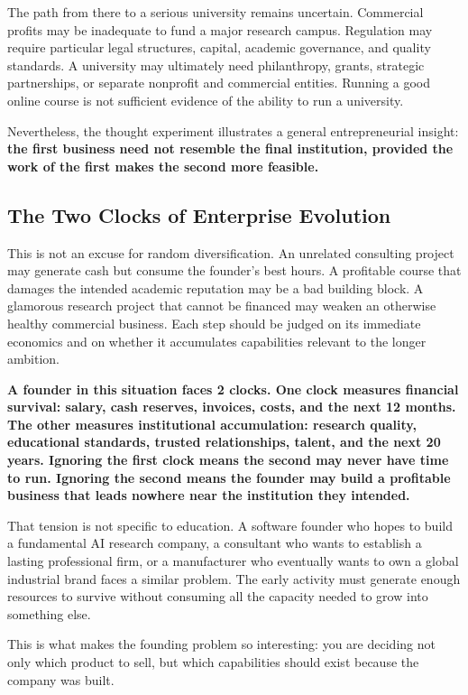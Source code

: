 The path from there to a serious university remains uncertain. Commercial profits may be inadequate to fund a major research campus. Regulation may require particular legal structures, capital, academic governance, and quality standards. A university may ultimately need philanthropy, grants, strategic partnerships, or separate nonprofit and commercial entities. Running a good online course is not sufficient evidence of the ability to run a university.

Nevertheless, the thought experiment illustrates a general entrepreneurial insight: \textbf{the first business need not resemble the final institution, provided the work of the first makes the second more feasible.}

\subsection{The Two Clocks of Enterprise Evolution}

This is not an excuse for random diversification. An unrelated consulting project may generate cash but consume the founder's best hours. A profitable course that damages the intended academic reputation may be a bad building block. A glamorous research project that cannot be financed may weaken an otherwise healthy commercial business. Each step should be judged on its immediate economics and on whether it accumulates capabilities relevant to the longer ambition.

\textbf{A founder in this situation faces 2 clocks. One clock measures financial survival: salary, cash reserves, invoices, costs, and the next 12 months. The other measures institutional accumulation: research quality, educational standards, trusted relationships, talent, and the next 20 years. Ignoring the first clock means the second may never have time to run. Ignoring the second means the founder may build a profitable business that leads nowhere near the institution they intended.}

That tension is not specific to education. A software founder who hopes to build a fundamental AI research company, a consultant who wants to establish a lasting professional firm, or a manufacturer who eventually wants to own a global industrial brand faces a similar problem. The early activity must generate enough resources to survive without consuming all the capacity needed to grow into something else.

This is what makes the founding problem so interesting: you are deciding not only which product to sell, but which capabilities should exist because the company was built.
